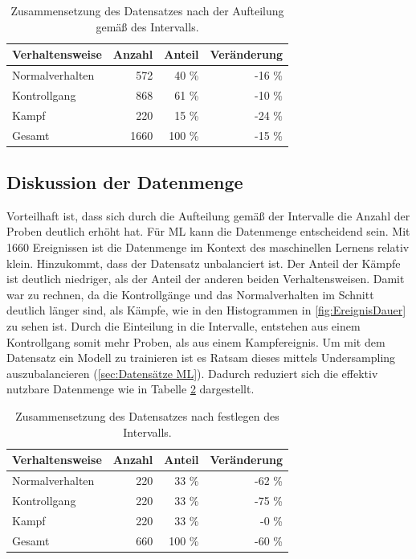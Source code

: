 \begin{table}[ht]
    \centering
    \caption{Zusammensetzung des Datensatzes nach der Aufteilung gemäß des Intervalls.}
    \begin{tabular}{|l|r|r|r|}
    \hline
        Verhaltensweise & Anzahl & Anteil & Veränderung\\
    \hline
        Normalverhalten & 572 & 40 \% & -16 \%\\
        Kontrollgang & 868 & 61 \% & -10 \%\\
        Kampf & 220 & 15 \% & -24 \%\\
    \hline
    \hline
        Gesamt & 1660 & 100 \% & -15 \% \\
    \hline
    \end{tabular}
    \label{tab:DatasetFeatExtr}
\end{table}


\subsection{Diskussion der Datenmenge}
Vorteilhaft ist, dass sich durch die Aufteilung gemäß der Intervalle die Anzahl der Proben deutlich erhöht hat. Für \gls{ML} kann die Datenmenge entscheidend sein. Mit 1660 Ereignissen ist die Datenmenge im Kontext des maschinellen Lernens relativ klein. Hinzukommt, dass der Datensatz unbalanciert ist. Der Anteil der Kämpfe ist deutlich niedriger, als der Anteil der anderen beiden Verhaltensweisen. Damit war zu rechnen, da die Kontrollgänge und das Normalverhalten im Schnitt deutlich länger sind, als Kämpfe, wie in den Histogrammen in \autoref{fig:EreignisDauer} zu sehen ist. Durch die Einteilung in die Intervalle, entstehen aus einem Kontrollgang somit mehr Proben, als aus einem Kampfereignis. Um mit dem Datensatz ein Modell zu trainieren ist es Ratsam dieses mittels Undersampling auszubalancieren (\autoref{sec:Datensätze ML}). Dadurch reduziert sich die effektiv nutzbare Datenmenge wie in Tabelle \ref{tab:DataNachBalance} dargestellt.

\begin{table}[ht]
    \centering
    \caption{Zusammensetzung des Datensatzes nach festlegen des Intervalls.}
    \begin{tabular}{|l|r|r|r|}
    \hline
        Verhaltensweise & Anzahl & Anteil & Veränderung\\
    \hline
        Normalverhalten & 220 & 33 \% & -62 \%\\
        Kontrollgang & 220 & 33 \% & -75 \%\\
        Kampf & 220 & 33 \% & -0 \%\\
    \hline
    \hline
        Gesamt & 660 & 100 \% & -60 \% \\
    \hline
    \end{tabular}
    \label{tab:DataNachBalance}
\end{table}

